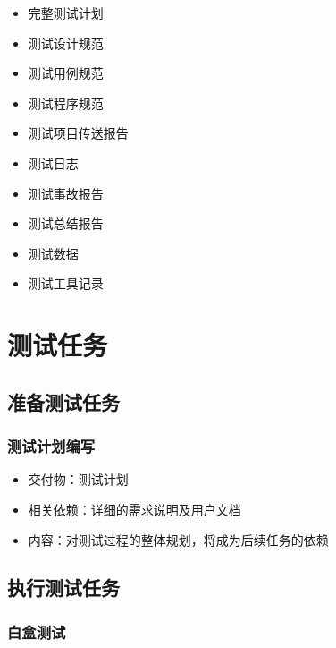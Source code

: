 \documentclass[hyperref, a4paper]{ctexart}
\providecommand{\tightlist}{%
  \setlength{\itemsep}{0pt}\setlength{\parskip}{0pt}}
\begin{document}
\begin{itemize}
\tightlist
\item
  完整测试计划
\item
  测试设计规范
\item
  测试用例规范
\item
  测试程序规范
\item
  测试项目传送报告
\item
  测试日志
\item
  测试事故报告
\item
  测试总结报告
\item
  测试数据
\item
  测试工具记录
\end{itemize}

\hypertarget{ux6d4bux8bd5ux4efbux52a1}{%
\section{测试任务}\label{ux6d4bux8bd5ux4efbux52a1}}

\hypertarget{ux51c6ux5907ux6d4bux8bd5ux4efbux52a1}{%
\subsection{准备测试任务}\label{ux51c6ux5907ux6d4bux8bd5ux4efbux52a1}}

\hypertarget{ux6d4bux8bd5ux8ba1ux5212ux7f16ux5199}{%
\subsubsection{测试计划编写}\label{ux6d4bux8bd5ux8ba1ux5212ux7f16ux5199}}

\begin{itemize}
\tightlist
\item
  交付物：测试计划
\item
  相关依赖：详细的需求说明及用户文档
\item
  内容：对测试过程的整体规划，将成为后续任务的依赖
\end{itemize}

\hypertarget{ux6267ux884cux6d4bux8bd5ux4efbux52a1}{%
\subsection{执行测试任务}\label{ux6267ux884cux6d4bux8bd5ux4efbux52a1}}

\hypertarget{ux767dux76d2ux6d4bux8bd5}{%
\subsubsection{白盒测试}\label{ux767dux76d2ux6d4bux8bd5}}
\end{document}
